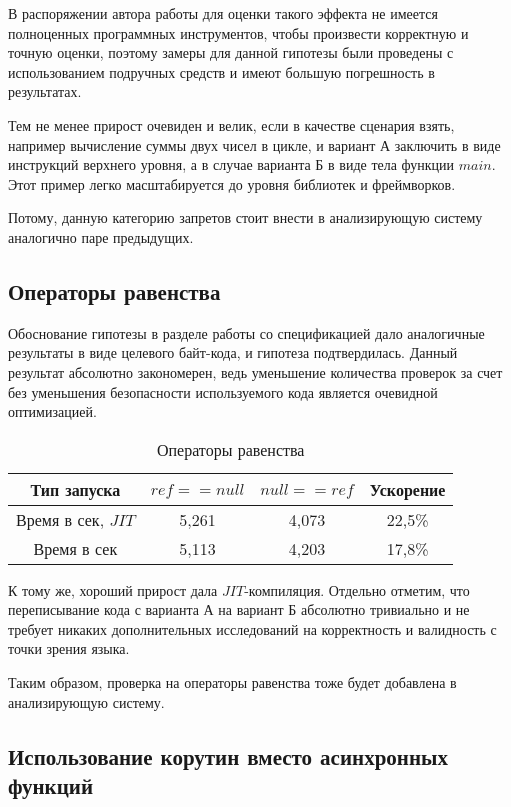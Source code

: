 \documentclass{mipt-thesis-bs}
\begin{document}
В распоряжении автора работы для оценки такого эффекта не имеется полноценных
программных инструментов, чтобы произвести корректную и точную оценки,
поэтому замеры для данной гипотезы были проведены с использованием подручных средств
и имеют большую погрешность в результатах.

Тем не менее прирост очевиден и велик, если в качестве сценария взять, например
вычисление суммы двух чисел в цикле, и вариант А заключить в виде инструкций верхнего
уровня, а в случае варианта Б в виде тела функции $main$. Этот пример легко
масштабируется до уровня библиотек и фреймворков.

Потому, данную категорию запретов стоит внести в анализирующую систему аналогично
паре предыдущих.


\subsection{Операторы равенства}

Обоснование гипотезы в разделе работы со спецификацией дало аналогичные
результаты в виде целевого байт-кода, и гипотеза подтвердилась. Данный результат
абсолютно закономерен, ведь уменьшение количества проверок за счет без уменьшения
безопасности используемого кода является очевидной оптимизацией.

\begin{table}[h]
    \centering
    \begin{tabular}{|c|c|c|c|}
      \hline
      Тип запуска & $ref == null$ & $null == ref$ & Ускорение \\
      \hline
      Время в сек, $JIT$ & 5,261 & 4,073 & 22,5\% \\
      \hline
      Время в сек & 5,113 & 4,203 & 17,8\% \\
      \hline
    \end{tabular}
    \caption{Операторы равенства}
  \end{table}

К тому же, хороший прирост дала $JIT$-компиляция. Отдельно отметим, что переписывание
кода с варианта А на вариант Б абсолютно тривиально и не требует никаких дополнительных
исследований на корректность и валидность с точки зрения языка.

Таким образом, проверка
на операторы равенства тоже будет добавлена в анализирующую систему.

\subsection{Использование корутин вместо асинхронных функций}
\end{document}
